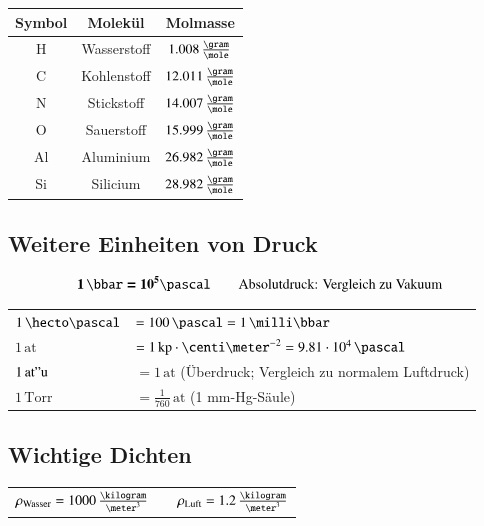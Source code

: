 \renewcommand{\arraystretch}{1.3}
\begin{tabular}{c | c | c }
	\textbf{Symbol} & \textbf{Molekül}  & \textbf{Molmasse}                 \\
	\hline
	H               & Wasserstoff       & $1.008 \, \frac{\gram}{\mole}$    \\
	C               & Kohlenstoff       & $12.011 \, \frac{\gram}{\mole}$   \\
	N               & Stickstoff        & $14.007 \, \frac{\gram}{\mole}$   \\
	O               & Sauerstoff        & $15.999 \, \frac{\gram}{\mole}$   \\
	Al              & Aluminium         & $26.982 \, \frac{\gram}{\mole}$   \\
	Si              & Silicium          & $28.982 \, \frac{\gram}{\mole}$   \\
\end{tabular}
\renewcommand{\arraystretch}{1.3}

\subsection{Weitere Einheiten von Druck}

\vspace{-0.2cm}
$$ \bm{1 \, \bbar = 10^5 \pascal} \qquad \text{Absolutdruck: Vergleich zu Vakuum} $$

\begin{tabular}{ll}
	$1 \, \hecto \pascal$   & $= 100 \, \pascal = 1 \, \milli \bbar $                                       \\
	$1 \, \mathrm{at}$      & $= 1 \, \mathrm{kp \cdot \centi \meter^{-2}} = 9.81 \cdot 10^4 \, \pascal$    \\
	$1 \, \mathrm{at"u}$    & $= 1 \, \mathrm{at}$ (Überdruck; Vergleich zu normalem Luftdruck)             \\
	$1 \, \mathrm{Torr}$    & $= \frac{1}{760} \, \mathrm{at}$ (1 mm-Hg-Säule)
\end{tabular}

\subsection{Wichtige Dichten}	

\begin{tabular}{l c l}
	$\rho_{\rm Wasser} = 1000 \, \frac{\kilogram}{\meter^3}$    & &  $\rho_{\rm Luft} = 1.2 \, \frac{\kilogram}{\meter^3}$
	
\end{tabular}


